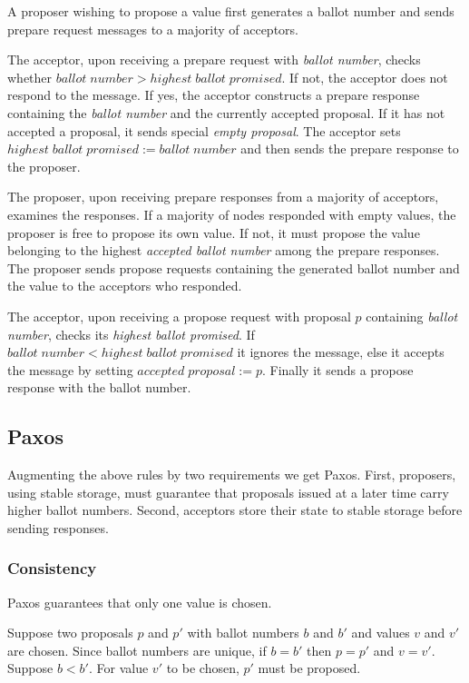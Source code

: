 \documentclass[12pt]{amsart}
\begin{document}
A proposer wishing to propose a value first generates a ballot number and sends prepare request messages to a majority of acceptors.

The acceptor, upon receiving a prepare request with \emph{ballot number}, checks whether $ballot \; number > highest \; ballot \; promised$. If not, the acceptor does not respond to the message.
If yes, the acceptor constructs a prepare response containing the \emph{ballot number} and the currently accepted proposal. If it has not accepted a proposal, it sends special \emph{empty proposal}. The acceptor sets $highest \; ballot \; promised := ballot \; number$ and then sends the prepare response to the proposer.

The proposer, upon receiving prepare responses from a majority of acceptors, examines the responses. If a majority of nodes responded with empty values, the proposer is free to propose its own value. If not, it must propose the value belonging to the highest \emph{accepted ballot number} among the prepare responses. The proposer sends propose requests containing the generated ballot number and the value to the acceptors who responded.

The acceptor, upon receiving a propose request with proposal $p$ containing \emph{ballot number}, checks its \emph{highest ballot promised}. If $ballot \; number < highest \; ballot \; promised$ it ignores the message, else it accepts the message by setting
$accepted \; proposal := p$.
Finally it sends a propose response with the ballot number.

\subsection{ Paxos }

Augmenting the above rules by two requirements we get Paxos. First, proposers, using stable storage, must guarantee that proposals issued at a later time carry higher ballot numbers. Second, acceptors store their state to stable storage before sending responses.

\subsubsection{ Consistency } Paxos guarantees that only one value is chosen.

Suppose two proposals $p$ and $p'$ with ballot numbers $b$ and $b'$ and values $v$ and $v'$ are chosen. Since ballot numbers are unique, if $b = b'$ then $p = p'$ and $v = v'$. Suppose $b < b'$. For value $v'$ to be chosen, $p'$ must be proposed.
\end{document}
